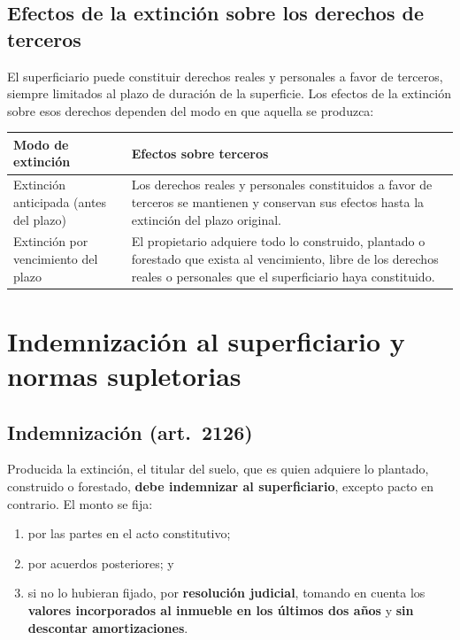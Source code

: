 \documentclass[12pt,oneside]{book}
\begin{document}
\subsection{Efectos de la extinción sobre los derechos de terceros}

El superficiario puede constituir derechos reales y personales a favor de terceros, siempre limitados al plazo de duración de la superficie. Los efectos de la extinción sobre esos derechos dependen del modo en que aquella se produzca:

\begin{table}[H]
\centering
\begin{tabularx}{\textwidth}{@{}>{\raggedright\arraybackslash}p{}>{\raggedright\arraybackslash}X@{}}
\toprule
\textbf{Modo de extinción} & \textbf{Efectos sobre terceros} \\
\midrule
Extinción anticipada (antes del plazo) & Los derechos reales y personales constituidos a favor de terceros se mantienen y conservan sus efectos hasta la extinción del plazo original. \\
Extinción por vencimiento del plazo & El propietario adquiere todo lo construido, plantado o forestado que exista al vencimiento, libre de los derechos reales o personales que el superficiario haya constituido. \\
\bottomrule
\end{tabularx}
\end{table}

\section{Indemnización al superficiario y normas supletorias}

\subsection{Indemnización (art.~2126)}

\begin{importante}
Producida la extinción, el titular del suelo, que es quien adquiere lo plantado, construido o forestado, \textbf{debe indemnizar al superficiario}, excepto pacto en contrario. El monto se fija:
\begin{enumerate}[label=(\alph*)]
    \item por las partes en el acto constitutivo;
    \item por acuerdos posteriores; y
    \item si no lo hubieran fijado, por \textbf{resolución judicial}, tomando en cuenta los \textbf{valores incorporados al inmueble en los últimos dos años} y \textbf{sin descontar amortizaciones}.
\end{enumerate}
\end{importante}
\end{document}
